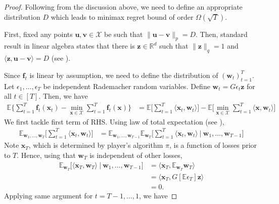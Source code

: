 \documentclass[12pt, a4paper]{report}
\begin{document}
\begin{proof}
Following from the discussion above, we need to define an appropriate distribution $D$ which leads to minimax regret bound of order $\Omega(\sqrt{T})$.

First, fixed any points $\mathbf{u}, \mathbf{v} \in \mathcal{X}$ be such that $\lVert \mathbf{u} - \mathbf{v} \rVert_p = D$. Then, standard result in linear algebra states that there is $\mathbf{z} \in \mathbb{R}^d$ such that $\lVert \mathbf{z} \rVert_q = 1$ and $\langle \mathbf{z}, \mathbf{u} - \mathbf{v} \rangle = D$ (see \cite[Chapter 7]{Royden2010Real}). 

Since $\mathbf{f}_t$ is linear by assumption, we need to define the distribution of $(\mathbf{w}_t)_{t=1}^T$. Let $\epsilon_1, \dots, \epsilon_T$ be independent Rademacher random variables. Define $\mathbf{w}_t = G\epsilon_t \mathbf{z}$ for all $t \in [T]$. Then, we have
\begin{align*}
    \mathbb{E} \Big\{\sum_{t=1}^T \mathbf{f}_t(\mathbf{x}_t) - \min_{\mathbf{x} \in \mathcal{X}} \sum_{t=1}^T \mathbf{f}_t(\mathbf{x}) \Big\} 
    &= 
    \mathbb{E} \Big[\sum_{t=1}^T \langle \mathbf{x}_t, \mathbf{w}_t \rangle\Big] - \mathbb{E} \Big[\min_{\mathbf{x} \in \mathcal{X}} \sum_{t=1}^T \langle \mathbf{x}, \mathbf{w}_t \rangle \Big]
\end{align*}
We first tackle first term of RHS. Using law of total expectation (see \cite[Theorem 9.7]{Williams1991Probability}), 
\begin{align*}
    \mathbb{E}_{\mathbf{w}_1, \dots, \mathbf{w}_T} \Big[\sum_{t=1}^T \langle \mathbf{x}_t, \mathbf{w}_t \rangle \Big] 
    &= \mathbb{E}_{\mathbf{w}_{1}, \dots, \mathbf{w}_{T-1}} \mathbb{E}_{\mathbf{w}_T} \Big[\sum_{t=1}^T \langle \mathbf{x}_t, \mathbf{w}_t \rangle\ \Big|\ \mathbf{w}_1, \dots, \mathbf{w}_{T-1} \Big]
\end{align*}
Note $\mathbf{x}_T$, which is determined by player's algorithm $\pi$, is a function of losses prior to $T$. Hence, using that $\mathbf{w}_T$ is independent of other losses,
\begin{align*}
    \mathbb{E}_{\mathbf{w}_T} \Big[\langle \mathbf{x}_T, \mathbf{w}_T\rangle\ \Big|\ \mathbf{w}_1, \dots, \mathbf{w}_{T-1} \Big] &= \langle \mathbf{x}_T, \mathbb{E}_{\mathbf{w}_T} \mathbf{w}_T \rangle
    \\
    &= \langle \mathbf{x}_T,G[\mathbb{E} \epsilon_T] \mathbf{z} \rangle
    \\
    &= 0.
\end{align*}
Applying same argument for $t=T-1, \dots, 1$, we have

\end{proof}
\end{document}
